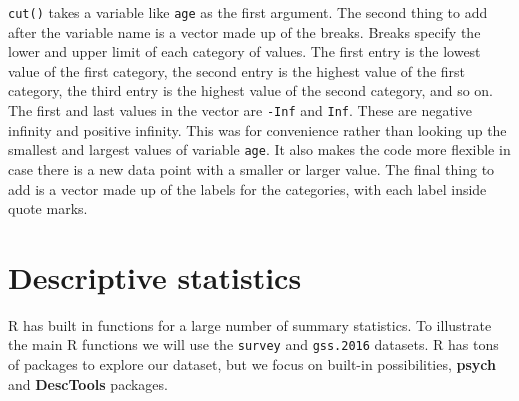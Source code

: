 \documentclass[
]{book}
\newenvironment{Shaded}{\begin{snugshade}}{\end{snugshade}}
\newcommand{\AttributeTok}[1]{\textcolor[rgb]{0.77,0.63,0.00}{#1}}
\newcommand{\CommentTok}[1]{\textcolor[rgb]{0.56,0.35,0.01}{\textit{#1}}}
\newcommand{\ConstantTok}[1]{\textcolor[rgb]{0.00,0.00,0.00}{#1}}
\newcommand{\DecValTok}[1]{\textcolor[rgb]{0.00,0.00,0.81}{#1}}
\newcommand{\FloatTok}[1]{\textcolor[rgb]{0.00,0.00,0.81}{#1}}
\newcommand{\FunctionTok}[1]{\textcolor[rgb]{0.00,0.00,0.00}{#1}}
\newcommand{\NormalTok}[1]{#1}
\newcommand{\OtherTok}[1]{\textcolor[rgb]{0.56,0.35,0.01}{#1}}
\newcommand{\SpecialCharTok}[1]{\textcolor[rgb]{0.00,0.00,0.00}{#1}}
\newcommand{\StringTok}[1]{\textcolor[rgb]{0.31,0.60,0.02}{#1}}
\begin{document}
\begin{Shaded}
\end{Shaded}

\texttt{cut()} takes a variable like \texttt{age} as the first argument. The second thing to add after the variable name is a vector made up of the breaks. Breaks specify the lower and upper limit of each category of values. The first entry is the lowest value of the first category, the second entry is the highest value of the first category, the third entry is the highest value of the second category, and so on. The first and last values in the vector are \texttt{-Inf} and \texttt{Inf}. These are negative infinity and positive infinity. This was for convenience rather than looking up the smallest and largest values of variable \texttt{age}. It also makes the code more flexible in case there is a new data point with a smaller or larger value. The final thing to add is a vector made up of the labels for the categories, with each label inside quote marks.

\hypertarget{descriptive-statistics}{%
\section{Descriptive statistics}\label{descriptive-statistics}}

R has built in functions for a large number of summary statistics. To illustrate the main R functions we will use the \texttt{survey} and \texttt{gss.2016} datasets. R has tons of packages to explore our dataset, but we focus on built-in possibilities, \textbf{psych} and \textbf{DescTools} packages.
\end{document}
